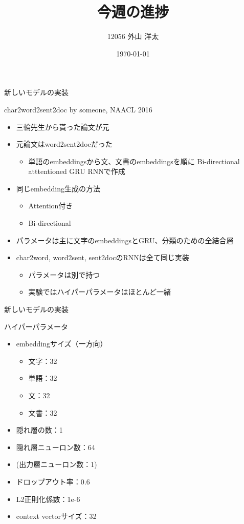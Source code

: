 \documentclass[aspectratio=43,unicode,10pt]{beamer}
\title{今週の進捗}
\institute{知能数理研究室}
\author{12056 外山 洋太}
\date{\today}
\begin{document}
\begin{frame}
\titlepage
\end{frame}

\begin{frame}{新しいモデルの実装}
  \begin{block}{char2word2sent2doc by someone, NAACL 2016}
    \begin{itemize}
      \item 三輪先生から貰った論文が元
      \item 元論文はword2sent2docだった
        \begin{itemize}
          \item 単語のembeddingsから文、文書のembeddingsを順に
                Bi-directional atttentioned GRU RNNで作成
        \end{itemize}
      \item 同じembedding生成の方法
        \begin{itemize}
          \item Attention付き
          \item Bi-directional
        \end{itemize}
      \item パラメータは主に文字のembeddingsとGRU、分類のための全結合層
      \item char2word, word2sent, sent2docのRNNは全て同じ実装
        \begin{itemize}
          \item パラメータは別で持つ
          \item 実験ではハイパーパラメータはほとんど一緒
        \end{itemize}
    \end{itemize}
  \end{block}
\end{frame}

\begin{frame}{新しいモデルの実装}
  \begin{block}{ハイパーパラメータ}
    \begin{itemize}
      \item embeddingサイズ（一方向）
        \begin{itemize}
          \item 文字：32
          \item 単語：32
          \item 文：32
          \item 文書：32
        \end{itemize}
      \item 隠れ層の数：1
      \item 隠れ層ニューロン数：64
      \item (出力層ニューロン数：1)
      \item ドロップアウト率：0.6
      \item L2正則化係数：1e-6
      \item context vectorサイズ：32
    \end{itemize}
  \end{block}
\end{frame}
\end{document}
